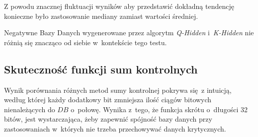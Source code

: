 Z powodu znacznej fluktuacji wyników aby przedstawić dokładną tendencję konieczne było zastosowanie mediany zamiast wartości średniej. 

Negatywne Bazy Danych wygenerowane przez algorytm \textit{Q-Hidden} i~\textit{K-Hidden} nie różnią się znacząco od siebie w~kontekście tego testu.

\subsection{Skuteczność funkcji sum kontrolnych}
Wynik porównania różnych metod sumy kontrolnej pokrywa się z intuicją, według której każdy dodatkowy bit zmniejsza ilość ciągów bitowych
nienależących do $DB$ o~połowę. Wynika z~tego, że funkcja skrótu o~długości 32 bitów, jest wystarczająca, żeby zapewnić spójność bazy danych
przy zastosowaniach w~których nie trzeba przechowywać danych krytycznych.

